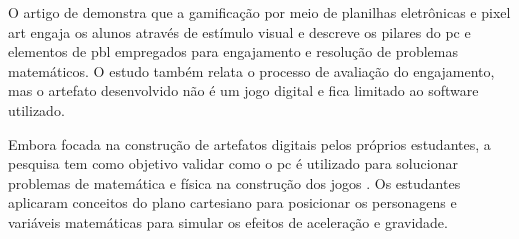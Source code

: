 \newpage{}
O artigo de  demonstra que a gamificação por meio de
planilhas eletrônicas e pixel art engaja os alunos através de estímulo visual e
descreve os pilares do \gls{pc} e elementos de \gls{pbl} empregados para engajamento e
resolução de problemas matemáticos. O estudo também relata o processo de
avaliação do engajamento, mas o artefato desenvolvido não é um jogo digital e
fica limitado ao software utilizado.

Embora focada na construção de artefatos digitais pelos próprios estudantes, a
pesquisa tem como objetivo validar como o \gls{pc} é utilizado para solucionar
problemas de matemática e física na construção dos jogos \cite{filho2025}.
Os estudantes aplicaram conceitos do plano cartesiano para
posicionar os personagens e variáveis matemáticas para simular os efeitos de
aceleração e gravidade.


